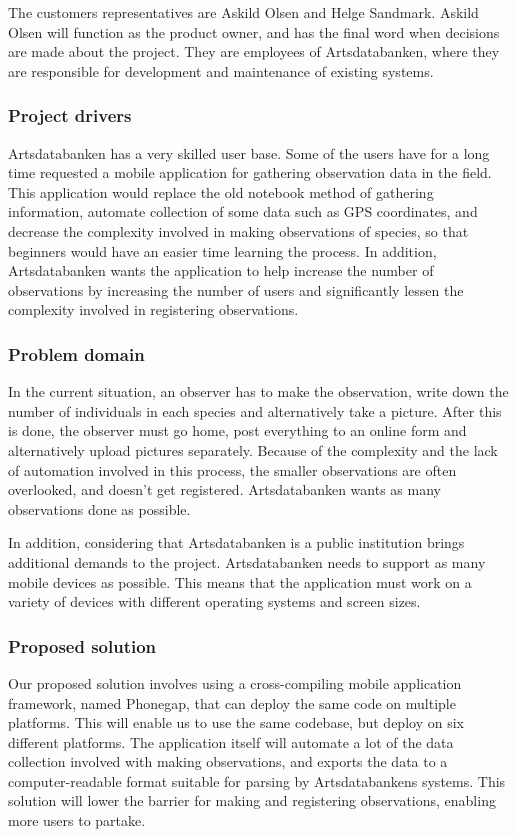 The customers representatives are Askild Olsen and Helge Sandmark. Askild Olsen
will function as the product owner, and has the final word when decisions are
made about the project. They are employees of Artsdatabanken, where they are
responsible for development and maintenance of existing systems. 

\subsubsection{Project drivers}
Artsdatabanken has a very skilled user base. Some of the users have for a long
time requested a mobile application for gathering observation data in the
field. This application would replace the old notebook method of gathering
information, automate collection of some data such as GPS coordinates, and
decrease the complexity involved in making observations of species, so that
beginners would have an easier time learning the process. In addition,
Artsdatabanken wants the application to help increase the number of
observations by increasing the number of users and significantly lessen the
complexity involved in registering observations.

\subsubsection{Problem domain}
In the current situation, an observer has to make the observation, write down
the number of individuals in each species and alternatively take a picture. After this is done,
the observer must go home, post everything to an online form and
alternatively upload pictures separately. Because of the complexity and the
lack of automation involved in this process, the smaller observations are often
overlooked, and doesn't get registered. Artsdatabanken wants as many
observations done as possible.

In addition, considering that Artsdatabanken is a public institution brings
additional demands to the project. Artsdatabanken needs to support as many
mobile devices as possible. This means that the application must work on
a variety of devices with different operating systems and screen sizes.

\subsubsection{Proposed solution}
Our proposed solution involves using a cross-compiling mobile application
framework, named Phonegap, that can deploy the same code on multiple platforms.
This will enable us to use the same codebase, but deploy on six different
platforms. The application itself will automate a lot of the data collection
involved with making observations, and exports the data to a computer-readable
format suitable for parsing by Artsdatabankens systems. This solution will
lower the barrier for making and registering observations, enabling more users
to partake.

